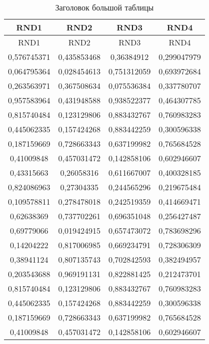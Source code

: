 \begin{longtable}{|c|c|c|c|}
	\caption{Заголовок большой таблицы}
	\label{tab:longtable}\\
	\hline
	\textbf{RND1} & \textbf{RND2} & \textbf{RND3} & \textbf{RND4} \\ \hline
	\endfirsthead

	\captioncont
	\hline
	RND1 & RND2 & RND3 & RND4 \\ \hline
	\endhead

	\hline
	\endfoot

	\hline
	\endlastfoot

0,576745371 & 0,435853468 & 0,36384912  & 0,299047979 \\
0,064795364 & 0,028454613 & 0,751312059 & 0,693972684 \\
0,263563971 & 0,367508634 & 0,075536384 & 0,337780707 \\
0,957583964 & 0,431948588 & 0,938522377 & 0,464307785 \\
0,815740484 & 0,123129806 & 0,883432767 & 0,760983283 \\
0,445062335 & 0,157424268 & 0,883442259 & 0,300596338 \\
0,187159669 & 0,728663343 & 0,637199982 & 0,765684528 \\
0,41009848  & 0,457031472 & 0,142858106 & 0,602946607 \\
0,43315663  & 0,26058316  & 0,611667007 & 0,400328185 \\
0,824086963 & 0,27304335  & 0,244565296 & 0,219675484 \\
0,109578811 & 0,278478018 & 0,242519359 & 0,414669471 \\
0,62638369  & 0,737702261 & 0,696351048 & 0,256427487 \\
0,69779066  & 0,019424915 & 0,657473072 & 0,783698296 \\
0,14204222  & 0,817006985 & 0,669234791 & 0,728306309 \\
0,38941124  & 0,807135743 & 0,702842593 & 0,382494957 \\
0,203543688 & 0,969191131 & 0,822881425 & 0,212473701 \\
0,815740484 & 0,123129806 & 0,883432767 & 0,760983283 \\
0,445062335 & 0,157424268 & 0,883442259 & 0,300596338 \\
0,187159669 & 0,728663343 & 0,637199982 & 0,765684528 \\
0,41009848  & 0,457031472 & 0,142858106 & 0,602946607 \\

\end{longtable}
